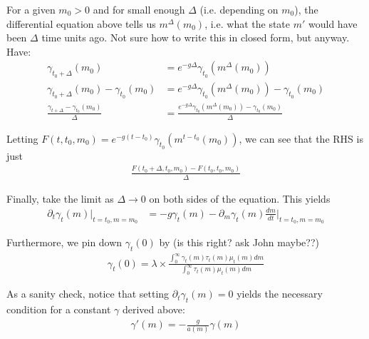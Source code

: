 \documentclass[12pt,english]{article}
\theoremstyle{remark}
\begin{document}
For a given $m_0 > 0$ and for small enough $\Delta$ (i.e. depending on $m_0$), the differential equation above tells us $m^{\Delta}(m_0)$, i.e. what the state $m'$ would have been $\Delta$ time units ago. Not sure how to write this in closed form, but anyway. Have: 
\begin{align*}
\gamma_{t_0+\Delta} (m_0) &= e^{-g \Delta} \gamma_{t_0}(m^\Delta(m_0)) \\
\gamma_{t_0 + \Delta} (m_0) - \gamma_{t_0} (m_0) &= e^{-g \Delta} \gamma_{t_0}(m^{\Delta}(m_0)) - \gamma_{t_0}(m_0) \\
\frac{\gamma_{t+\Delta} - \gamma_{t_0}(m_0)}{\Delta} &= \frac{e^{-g\Delta} \gamma_{t_0}(m^{\Delta}(m_0)) - \gamma_{t_0}(m_0)}{\Delta}
\end{align*}

Letting $F(t,t_0,m_0) = e^{-g(t-t_0)}\gamma_{t_0}(m^{t-t_0}(m_0))$, we can see that the RHS is just 
\begin{align*}
\frac{F(t_0+\Delta,t_0,m_0) - F(t_0,t_0,m_0)}{\Delta}
\end{align*}

Finally, take the limit as $\Delta \to 0$ on both sides of the equation. This yields 
\begin{align*}
\partial_t \gamma_t(m) \Big|_{t = t_0,m=m_0} &= -g \gamma_t(m) - \partial_m \gamma_t(m) \frac{dm}{dt} \Big|_{t = t_0,m=m_0}
\end{align*}

Furthermore, we pin down $\gamma_t(0)$ by (is this right? ask John maybe??)
\begin{align*}
\gamma_t(0) = \lambda \times \frac{\int_{0}^{\infty} \gamma_t(m) \tau_t(m) \mu_t(m) dm}{\int_{0}^{\infty} \tau_t(m) \mu_t(m) dm}
\end{align*}

As a sanity check, notice that setting $\partial_t \gamma_t(m) = 0$ yields the necessary condition for a constant $\gamma$ derived above:
\begin{align*}
\gamma'(m) = -\frac{g}{a(m)} \gamma(m) 
\end{align*}
\end{document}
